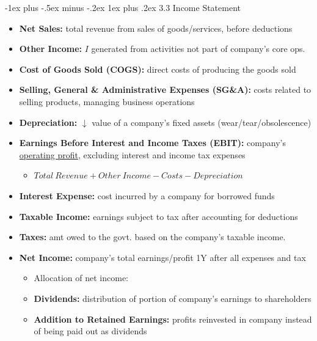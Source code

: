 \documentclass[10pt,landscape]{article}
\makeatletter
\newcommand{\subsubsubsection}{\@startsection{subsubsection}{3}{0mm}%
                                {-1ex plus -.5ex minus -.2ex}%
                                {1ex plus .2ex}%
                                {\normalfont\scriptsize\bfseries}}
\makeatother
\begin{document}
\begin{multicols*}{3}
\subsubsubsection{3.3 Income Statement}
\begin{itemize}[topsep=0pt,noitemsep,wide=0pt, leftmargin=\dimexpr{} + 2\relax]
    \item \textbf{Net Sales:} total revenue from sales of goods/services, before deductions
    \item \textbf{Other Income:} $I$ generated from activities not part of company’s core ops.
    \item \textbf{Cost of Goods Sold (COGS):} direct costs of producing the goods sold
    \item \textbf{Selling, General \& Administrative Expenses (SG\&A):} costs related to selling products, managing business operations
    \item \textbf{Depreciation:} $\downarrow$ value of a company's fixed assets (wear/tear/obsolescence)
    \item \textbf{Earnings Before Interest and Income Taxes (EBIT):} company’s \underline{operating profit}, excluding interest and income tax expenses
    \begin{itemize}[topsep=0pt,noitemsep,wide=0pt, leftmargin=\dimexpr{} + 2\relax]
        \item $Total \ Revenue + Other \ Income - Costs - Depreciation$
    \end{itemize}
    \item \textbf{Interest Expense:} cost incurred by a company for borrowed funds
    \item \textbf{Taxable Income:} earnings subject to tax after accounting for deductions
    \item \textbf{Taxes:} amt owed to the govt. based on the company’s taxable income.
    \item \textbf{Net Income:} company’s total earnings/profit 1Y after all expenses and tax
    \begin{itemize}[topsep=0pt,noitemsep,wide=0pt, leftmargin=\dimexpr{} + 2\relax]
        \item Allocation of net income:
        \item \textbf{Dividends:} distribution of portion of company’s earnings to shareholders
        \item \textbf{Addition to Retained Earnings:} profits reinvested in company instead of being paid out as dividends
    \end{itemize}
\end{itemize}


\end{multicols*}
\end{document}
